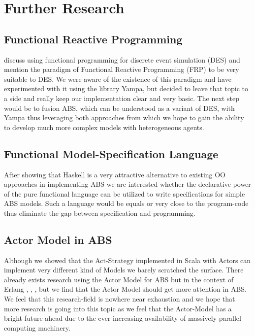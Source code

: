\section{Further Research}

\subsection{Functional Reactive Programming}
\cite{jankovic_functional_2007} discuss using functional programming for discrete event simulation (DES) and mention the paradigm of Functional Reactive Programming (FRP) to be very suitable to DES. We were aware of the existence of this paradigm and have experimented with it using the library Yampa, but decided to leave that topic to a side and really keep our implementation clear and very basic. The next step would be to fusion ABS, which can be understood as a variant of DES, with Yampa thus leveraging both approaches from which we hope to gain the ability to develop much more complex models with heterogeneous agents.

\subsection{Functional Model-Specification Language}
After showing that Haskell is a very attractive alternative to existing OO approaches in implementing ABS we are interested whether the declarative power of the pure functional language can be utilized to write specifications for simple ABS models. Such a language would be equals or very close to the program-code thus eliminate the gap between specification and programming.

\subsection{Actor Model in ABS}
Although we showed that the Act-Strategy implemented in Scala with Actors can implement very different kind of Models we barely scratched the surface. There already exists research using the Actor Model for ABS but in the context of Erlang \cite{varela_modelling_2004}, \cite{di_stefano_using_2005}, \cite{di_stefano_exat:_2007}, \cite{sher_agent-based_2013} but we find that the Actor Model should get more attention in ABS. We feel that this research-field is nowhere near exhaustion and we hope that more research is going into this topic as we feel that the Actor-Model has a bright future ahead due to the ever increasing availability of massively parallel computing machinery.